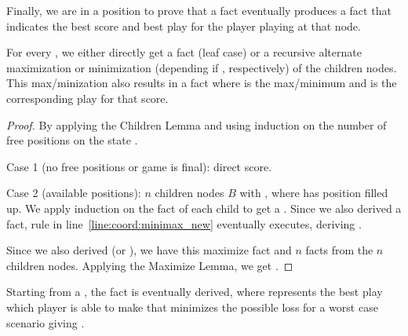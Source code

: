 Finally, we are in a position to prove that a  fact eventually
produces a  fact that indicates the best score and best play for the
player playing at that node.

\begin{theorem}
For every , we either
directly get a  fact (leaf case) or a recursive alternate maximization or
minimization (depending if , respectively) of
the children nodes. This max/minization also results in a  fact where  is the max/minimum and  is the
corresponding play for that score.
\end{theorem}
\begin{proof}
By applying the Children Lemma and using induction on the number of free
positions on the state .

Case 1 (no free positions or game is final): direct score.

Case 2 (available positions): $n$ children nodes $B$ with , where  has position
 filled up. We apply induction on the  fact of each child
 to get a . Since we also derived a
 fact, rule in line~\ref{line:coord:minimax_new} eventually
executes, deriving .

Since we also derived  (or ), we
have this maximize fact and $n$  facts from the $n$ children
nodes. Applying the Maximize Lemma, we get .

\end{proof}

\begin{corollary}[MiniMax]
Starting from a , the fact
 is eventually derived, where  represents the
best play which player  is able to make that minimizes the possible loss for
a worst case scenario giving .
\end{corollary}
\clearpage
